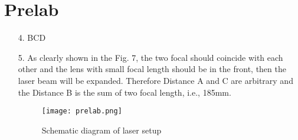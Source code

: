 \documentclass[12pt]{article}
\begin{document}
\section{Prelab}
\begin{enumerate}
    \item[4.] BCD
    \item[5.] As clearly shown in the Fig. 7, the two focal should coincide with each other and the lens with small focal length should be in the front, then the laser beam will be expanded. Therefore Distance A and C are arbitrary and the Distance B is the sum of two focal length, i.e., 185mm. 
    \begin{figure}[H]
        \centering
        \texttt{[image: prelab.png]}
        \caption{Schematic diagram of laser setup}
        \label{fig:my_label}
    \end{figure}
    
\end{enumerate}
\end{document}
